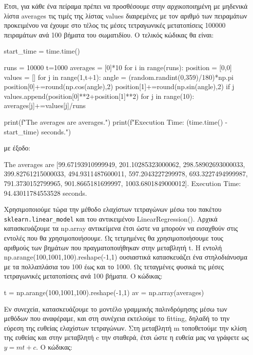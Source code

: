 Έτσι, για κάθε ένα πείραμα πρέπει να προσθέσουμε στην αρχικοποιημένη με μηδενικά λίστα {\en averages} τις τιμές της λίστας {\en values} διαιρεμένες με τον αριθμό των πειραμάτων προκειμένου να έχουμε στο τέλος τις μέσες τετραγωνικές μετατοπίσεις 100000 πειραμάτων ανά 100 βήματα του σωματιδίου.
\newpage
\noindent
Ο τελικός κώδικας θα είναι: \en
\begin{python}
start_time = time.time()

runs = 10000
t=1000
averages = [0]*10
for i in range(runs):
    position = [0,0]
    values = []
    for j in range(1,t+1):
        angle = (random.randint(0,359)/180)*np.pi
        position[0]+=round(np.cos(angle),2)
        position[1]+=round(np.sin(angle),2)
        if j%
            values.append(position[0]**2+position[1]**2)
    for j in range(10):
        averages[j]+=values[j]/runs

print(f"The averages are {averages}.")
print(f"Execution Time: {(time.time() - start_time)} seconds.")
\end{python}
\gr 
με έξοδο:
\en
\begin{python}
The averages are [99.67193910999949, 
                  201.10285323000062, 
                  298.58902693000033, 
                  399.82761215000033, 
                  494.9311487600011, 
                  597.2043227299978, 
                  693.3227494999987, 
                  791.3730152799965, 
                  901.8665181699997, 
                  1003.6801849000012].
Execution Time: 94.43011784553528 seconds.
\end{python}
\gr 
Χρησιμοποιούμε τώρα την μέθοδο ελαχίστων τετραγώνων μέσω του πακέτου {\en \texttt{sklearn.linear\_model}} και του αντικειμένου {\en LinearRegression()}. Αρχικά κατασκευάζουμε τα {\en np.array} αντικείμενα έτσι ώστε να μπορούν να εισαχθούν στις εντολές που θα χρησιμοποιήσουμε. Ως τετμημένες θα χρησιμοποιήσουμε τους αριθμούς των βημάτων που πραγματοποιήθηκαν στην μεταβλητή {\en t}. Η εντολή {\en  np.arange(100,1001,100).reshape(-1,1)} ουσιαστικά κατασκευάζει ένα στηλοδιάνυσμα με τα πολλαπλάσια του 100 έως και το 1000.  Ως τεταγμένες φυσικά τις μέσες τετραγωνικές μετατοπίσεις ανά 100 βήματα. 
\newpage
\noindent
Ο κώδικας:
\en
\begin{python}
t = np.arange(100,1001,100).reshape(-1,1)
av = np.array(averages)
\end{python}
\gr 
Εν συνεχεία, κατασκευάζουμε το μοντέλο γραμμικής παλινδρόμησης μέσω των μεθόδων που αναφέραμε, και στη συνέχεια εκτελούμε το {\en fitting}, δηλαδή το την εύρεση της ευθείας ελαχίστων τετραγώνων. Στη μεταβλητή {\en m} τοποθετούμε την κλίση της ευθείας και στην μεταβλητή {\en c} την σταθερά, έτσι ώστε η ευθεία μας να γράφετε ως $y = m t+c$. Ο κώδικας:
